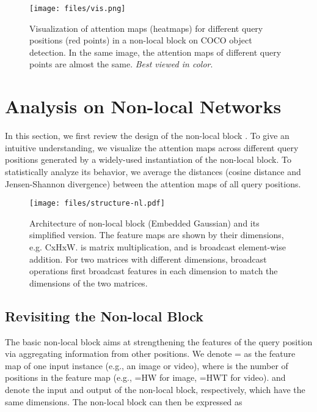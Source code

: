 \documentclass[10pt,twocolumn,letterpaper]{article}
\begin{document}
\begin{figure*}[!htb]
    \centering
    \texttt{[image: files/vis.png]}
	\vspace{-8pt}
	\caption{Visualization of attention maps (heatmaps) for different query positions (red points) in a non-local block on COCO object detection. In the same image, the attention maps of different query points are almost the same. \emph{Best viewed in color}.}
	\label{fig:vis-nlocal}
	\vspace{-15pt}
\end{figure*}

\section{Analysis on Non-local Networks}\label{sec:analysis}
In this section, we first review the design of the non-local block \cite{wang2017non}. 
To give an intuitive understanding, we visualize the attention maps across different query positions generated by a widely-used instantiation of the non-local block. 
To statistically analyze its behavior, we average the distances (cosine distance and Jensen-Shannon divergence) between the attention maps of all query positions.

\begin{figure}[!htb]
    \centering
    \texttt{[image: files/structure-nl.pdf]}
	\vspace{-8pt}
	\caption{{Architecture of non-local block (Embedded Gaussian) and its simplified version}. The feature maps are shown by their dimensions, e.g. CxHxW.  is matrix multiplication, and  is broadcast element-wise addition. For two matrices with different dimensions, broadcast operations first broadcast features in each dimension to match the dimensions of the two matrices.}
	\label{fig:arch-nl}
	\vspace{-10pt}
\end{figure}

\subsection{Revisiting the Non-local Block} 
The basic non-local block \cite{wang2017non} aims at strengthening the features of the query position via aggregating information from other positions.
We denote = as the  feature map of one input instance (e.g., an image or video), where  is the number of positions in the feature map (e.g., =HW for image, =HWT for video).  and  denote the input and output of the non-local block, respectively, which have the same dimensions. The non-local block can then be expressed as
\end{document}
